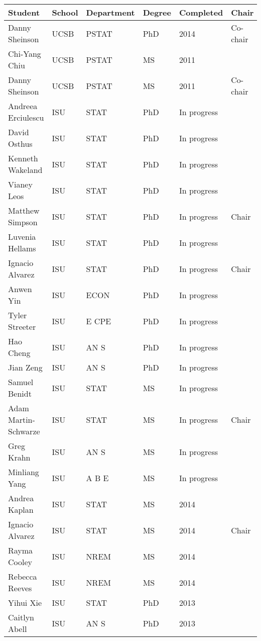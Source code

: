 \begin{table}[h]
\centering
\begin{tabular}{llllll}
  \hline
Student & School & Department & Degree & Completed & Chair \\ 
  \hline
Danny Sheinson & UCSB & PSTAT & PhD & 2014 & Co-chair \\ 
  Chi-Yang Chiu & UCSB & PSTAT & MS & 2011 &  \\ 
  Danny Sheinson & UCSB & PSTAT & MS & 2011 & Co-chair \\ 
  Andreea Erciulescu & ISU & STAT & PhD & In progress &  \\ 
  David Osthus & ISU & STAT & PhD & In progress &  \\ 
  Kenneth Wakeland & ISU & STAT & PhD & In progress &  \\ 
  Vianey Leos & ISU & STAT & PhD & In progress &  \\ 
  Matthew Simpson & ISU & STAT & PhD & In progress & Chair \\ 
  Luvenia Hellams & ISU & STAT & PhD & In progress &  \\ 
  Ignacio Alvarez & ISU & STAT & PhD & In progress & Chair \\ 
  Anwen Yin & ISU & ECON & PhD & In progress &  \\ 
  Tyler Streeter & ISU & E CPE & PhD & In progress &  \\ 
  Hao Cheng & ISU & AN S & PhD & In progress &  \\ 
  Jian Zeng & ISU & AN S & PhD & In progress &  \\ 
  Samuel Benidt & ISU & STAT & MS & In progress &  \\ 
  Adam Martin-Schwarze & ISU & STAT & MS & In progress & Chair \\ 
  Greg Krahn & ISU & AN S & MS & In progress &  \\ 
  Minliang Yang & ISU & A B E & MS & In progress &  \\ 
  Andrea Kaplan & ISU & STAT & MS & 2014 &  \\ 
  Ignacio Alvarez & ISU & STAT & MS & 2014 & Chair \\ 
  Rayma Cooley & ISU & NREM & MS & 2014 &  \\ 
  Rebecca Reeves & ISU & NREM & MS & 2014 &  \\ 
  Yihui Xie & ISU & STAT & PhD & 2013 &  \\ 
  Caitlyn Abell & ISU & AN S & PhD & 2013 &  \\ 

\end{tabular}
\end{table}
